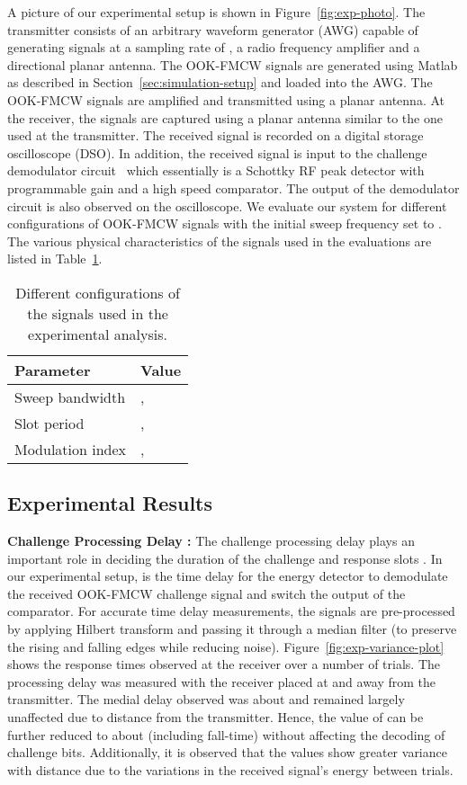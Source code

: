 \documentclass{sig-alternate-10pt}
\begin{document}
A picture of our experimental setup is shown in Figure~\ref{fig:exp-photo}. The
transmitter consists of an arbitrary waveform generator (AWG) capable of
generating signals at a sampling rate of , a  radio
frequency amplifier and a directional planar antenna. The OOK-FMCW signals are
generated using Matlab as described in Section~\ref{sec:simulation-setup} and
loaded into the AWG. The OOK-FMCW signals are amplified and transmitted using a
planar antenna. At the receiver, the signals are captured using a planar antenna
similar to the one used at the transmitter. The received signal is recorded on a
 digital storage oscilloscope (DSO). In addition, the received
signal is input to the challenge demodulator circuit~\cite{ltc5564datasheet}
which essentially is a Schottky RF peak detector with programmable gain and a
high speed comparator. The output of the demodulator circuit is also observed on
the oscilloscope. We evaluate our system for different configurations of
OOK-FMCW signals with the initial sweep frequency  set to .
The various physical characteristics of the signals used in the evaluations are
listed in Table~\ref{tab:exp-sig-config}.

\begin{table}
  \centering
  \begin{tabular}[h]{l|l}
  \hline
  \textbf{Parameter}&\textbf{Value}\\
  \hline
  Sweep bandwidth  & , \\
  Slot period  & , \\
  Modulation index & , \\
  \hline
  \end{tabular}
  \caption{Different configurations of the signals used in the experimental analysis.}
  \label{tab:exp-sig-config}
\end{table}

\subsection{Experimental Results}
\label{sec:experimental-results}

\textbf{Challenge Processing Delay :} The challenge processing delay 
plays an important role in deciding the duration of the challenge and response
slots . In our experimental setup,  is the time delay for the energy
detector to demodulate the received OOK-FMCW challenge signal and switch the
output of the comparator. For accurate time delay measurements, the signals are
pre-processed by applying Hilbert transform and passing it through a median
filter (to preserve the rising and falling edges while reducing noise).
Figure~\ref{fig:exp-variance-plot} shows the response times observed at the
receiver over a number of trials. The processing delay was measured with the
receiver placed at  and  away from the transmitter. The medial
delay observed was about  and remained largely unaffected due to
distance from the transmitter. Hence, the value of  can be further reduced
to about  (including fall-time) without affecting the decoding of
challenge bits. Additionally, it is observed that the  values show greater
variance with distance due to the variations in the received signal's energy
between trials.
\end{document}
